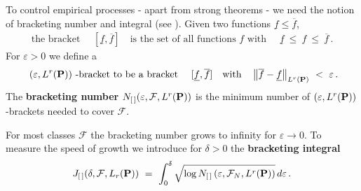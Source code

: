 To control empirical processes - apart from strong theorems - we need the notion of bracketing number and integral (see \cite[page 270]{Vaart2000}). 
Given two functions $\underline{f}\le \overline{f}$,
\begin{gather*}
  \text{
the bracket
  }\quad
[\underline{f},\overline{f}]
\quad 
\text{
is the set of all functions $f$ with 
}\quad 
\underline{f}\ \le\ f \ \le\  \overline{f}
\,.
\end{gather*}
For $\varepsilon>0$
we define a
\begin{gather*}
  \text{
$(\varepsilon, L^{r}(\P))$ -bracket
to be a bracket
  }
  \quad
[\underline{f},\overline{f}]
\quad
\text{with}
\quad
\norm{\overline{f}-\underline{f}}_{ L^r(\P)}
\ <\  \varepsilon
\,.
\end{gather*}
The \textbf{
bracketing number
} 
$
N_{[\,]}(\varepsilon, \mathcal{F}, L^r(\P))
$
is 
the minimum number of 
$(\varepsilon, L^{r}(\P))$-brackets needed to cover $\mathcal{F}$.

For most classes $\mathcal{F}$ the bracketing number grows to infinity for $\varepsilon\to 0$.
To measure the speed of growth we introduce 
for $\delta>0$
the
\textbf{bracketing integral}
\begin{gather*}
     J
    _{[\,]}
    (
    \delta
    ,
    \mathcal{F}
    ,
    L_r(\P)
    )
    \ 
    =
    \ 
  \int_0^{\delta}
      \sqrt{
        \log 
      N_{[\,]}
\left( \varepsilon, \mathcal{F}_N, L^r(\P) \right)
    }
    \,
    d\varepsilon
    \,.
\end{gather*}

